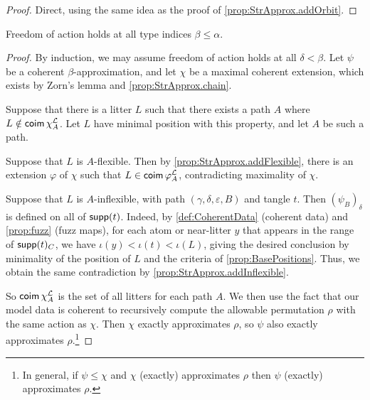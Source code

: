 \begin{proof}
  Direct, using the same idea as the proof of \cref{prop:StrApprox.addOrbit}.
\end{proof}
\begin{theorem}
  \label{thm:StrApprox.foa}
  Freedom of action holds at all type indices \( \beta \leq \alpha \).
\end{theorem}
\begin{proof}
  By induction, we may assume freedom of action holds at all \( \delta < \beta \).
  Let \( \psi \) be a coherent \( \beta \)-approximation, and let \( \chi \) be a maximal coherent extension, which exists by Zorn's lemma and \cref{prop:StrApprox.chain}.

  Suppose that there is a litter \( L \) such that there exists a path \( A \) where \( L \notin \operatorname{\mathsf{coim}} \chi_A^{\mathcal L} \).
  Let \( L \) have minimal position with this property, and let \( A \) be such a path.

  Suppose that \( L \) is \( A \)-flexible.
  Then by \cref{prop:StrApprox.addFlexible}, there is an extension \( \varphi \) of \( \chi \) such that \( L \in \operatorname{\mathsf{coim}} \varphi_A^{\mathcal L} \), contradicting maximality of \( \chi \).

  Suppose that \( L \) is \( A \)-inflexible, with path \( (\gamma,\delta,\varepsilon,B) \) and tangle \( t \).
  Then \( (\psi_B)_\delta \) is defined on all of \( \operatorname{\mathsf{supp}}(t) \).
  Indeed, by \cref{def:CoherentData} (coherent data) and \cref{prop:fuzz} (fuzz maps), for each atom or near-litter \( y \) that appears in the range of \( \operatorname{\mathsf{supp}}(t)_C \), we have \( \iota(y) < \iota(t) < \iota(L) \), giving the desired conclusion by minimality of the position of \( L \) and the criteria of \cref{prop:BasePositions}.
  Thus, we obtain the same contradiction by \cref{prop:StrApprox.addInflexible}.

  So \( \operatorname{\mathsf{coim}} \chi_A^{\mathcal L} \) is the set of all litters for each path \( A \).
  We then use the fact that our model data is coherent to recursively compute the allowable permutation \( \rho \) with the same action as \( \chi \).
  Then \( \chi \) exactly approximates \( \rho \), so \( \psi \) also exactly approximates \( \rho \).\footnote{In general, if \( \psi \leq \chi \) and \( \chi \) (exactly) approximates \( \rho \) then \( \psi \) (exactly) approximates \( \rho \).}
\end{proof}

